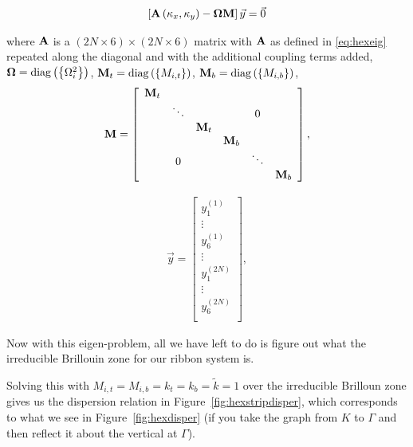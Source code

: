 \begin{align}
  \left[\mathbf{A}\left(\kappa_{x},\kappa_{y}\right)-\mathbf{\Omega}\mathbf{M}\right]\vec{y}=\vec{0}
\label{eq:hexstripeig}
\end{align}

where $\mathbf{A}$ is a $(2N \times 6) \times (2N \times 6)$ matrix with
$\mathbf{A}$ as defined in \eqref{eq:hexeig} repeated along the diagonal and with
the additional coupling terms added,
$\mathbf{\Omega}=\operatorname{diag}\left(\left\{\Omega_i^2\right\}\right)$,
$\mathbf{M}_{t}=\operatorname{diag}\left(\left\{M_{i,t}\right\}\right)$,
$\mathbf{M}_{b}=\operatorname{diag}\left(\left\{M_{i,b}\right\}\right)$,
\begin{align}
\mathbf{M}=\left[
\begin{array}{cccccc}
\mathbf{M}_{t}\\
 & \ddots &  &  & 0\\
 &  & \mathbf{M}_{t}\\
 &  &  & \mathbf{M}_{b}\\
 & 0 &  &  & \ddots\\
 &  &  &  &  & \mathbf{M}_{b}
\end{array}\right],
\end{align}

\begin{align}
\vec{y}=\left[
\begin{array}{c}
y_1^{(1)}\\
\vdots\\
y_6^{(1)}\\
\vdots\\
y_1^{(2N)}\\
\vdots\\
y_6^{(2N)}\\
\end{array}\right],
\end{align}

Now with this eigen-problem, all we have left to do is figure out what the
irreducible Brillouin zone for our ribbon system is.

Solving this with $M_{i,t}=M_{i,b}=k_t=k_b=\tilde{k}=1$ over the irreducible
Brilloun zone gives us the dispersion relation in
Figure~\ref{fig:hexstripdisper}, which corresponds to what we see in
Figure~\ref{fig:hexdisper} (if you take the graph from $K$ to $\Gamma$ and then
reflect it about the vertical at $\Gamma$).

